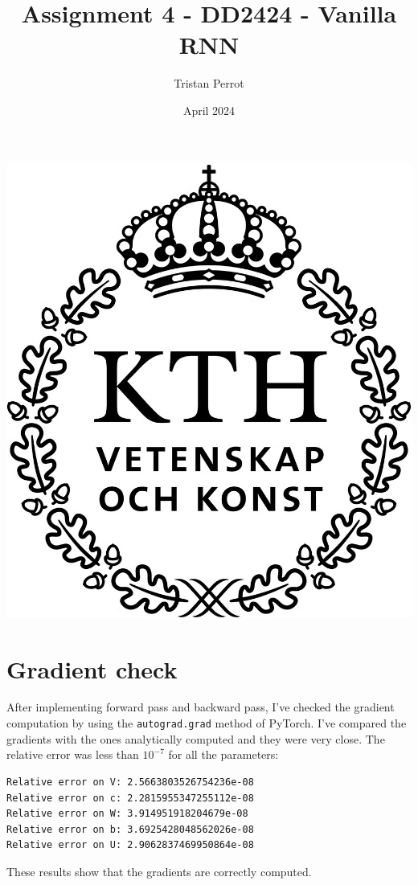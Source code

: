 \documentclass{article}
\title{Assignment 4 - DD2424 - Vanilla RNN}
\author{Tristan Perrot}
\date{April 2024}
\begin{document}
\maketitle
\begin{center}
    \includegraphics[scale=0.25]{images/KTH_logo_RGB_svart.png}
\end{center}

\section*{Gradient check}

After implementing forward pass and backward pass, I've checked the gradient computation by using the \texttt{autograd.grad} method of PyTorch. I've compared the gradients with the ones analytically computed and they were very close. The relative error was less than $10^{-7}$ for all the parameters:
\begin{verbatim}
Relative error on V: 2.5663803526754236e-08
Relative error on c: 2.2815955347255112e-08
Relative error on W: 3.914951918204679e-08
Relative error on b: 3.6925428048562026e-08
Relative error on U: 2.9062837469950864e-08
\end{verbatim}
These results show that the gradients are correctly computed.
\end{document}
